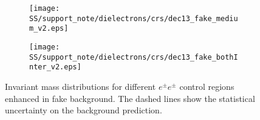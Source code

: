 \begin{table}[htbp]
\caption{Expected and observed numbers of electron pairs for the different like-sign $ee$ fake control regions. 
The uncertainties on the predictions include the statistical and systematic uncertainties (fake factor and charge flip 
uncertainties have been included; other systematic uncertainties are negligible in these regions). 
}
    \centering
\label{tab:ee_fakeCR}
\end{table}



\begin{figure}
\begin{subfigure}{.5\textwidth}
  \centering
  \texttt{[image: SS/support\_note/dielectrons/crs/dec13\_fake\_medium\_v2.eps]}
\end{subfigure}%
\begin{subfigure}{.5\textwidth}
  \centering
  \texttt{[image: SS/support\_note/dielectrons/crs/dec13\_fake\_bothInter\_v2.eps]}
\end{subfigure}
\caption{\toDo Invariant mass distributions for different $e^{\pm}e^{\pm}$ control regions enhanced in fake background. The dashed lines show the statistical uncertainty on the background prediction.}
  \label{fig:fakeCR_part1}
\end{figure}

